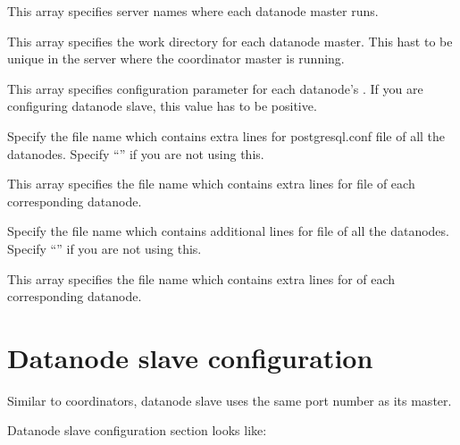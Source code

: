 	  This array specifies server names where each datanode master runs.
  
  
	  This array specifies the work directory for each datanode master.
	  This hast to be unique in the server where the coordinator master is running.
  
  
	  This array specifies  configuration parameter for each datanode's
	  .
	  If you are configuring datanode slave, this value has to be positive.
  
  
	  Specify the file name which contains extra lines for postgresql.conf file of all the datanodes.
	  Specify ``'' if you are not using this.
  
  
	  This array specifies the file name which contains extra lines for 
	  file of each corresponding datanode.
  
  
	  Specify the file name which contains additional lines for  file of
	  all the datanodes.
	  Specify ``'' if you are not using this.
  
  
	  This array specifies the file name which contains extra lines for  of
	  each corresponding datanode.
  


\section{Datanode slave configuration}
  
  Similar to coordinators, datanode slave uses the same port number as its master.
  
  Datanode slave configuration section looks like:
  
